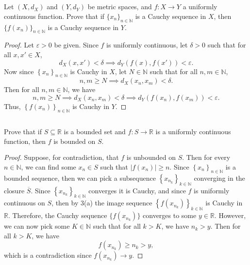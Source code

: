 \documentclass[12pt]{article}
\newenvironment{problem}
    {\begin{lrbox}{\mybox}\begin{minipage}{0.98\textwidth}}
    {\end{minipage}\end{lrbox}\framebox[\textwidth]{\usebox{\mybox}}}
\newcommand{\N}{\mathbb{N}}
\newcommand{\R}{\mathbb{R}}
\newcommand{\eps}{\varepsilon}
\newcommand{\seq}[2][n]{\left\{#2\right\}_{#1\in\N}}
\begin{document}
\newpage
\section{}
\subsection{}
\begin{problem}
    Let $(X,d_X)$ and $(Y,d_Y)$ be  metric spaces, and $f:X \to Y$ a uniformly continuous function. Prove that if $\{x_n\}_{n\in\N}$ is a Cauchy sequence in $X$, then $\{f(x_n)\}_{n\in\N}$ is a Cauchy sequence in $Y$. 
\end{problem}

\begin{proof}
    Let $\eps > 0$ be given. Since $f$ is uniformly continuous, let $\delta > 0$ such that for all $x, x' \in X$,
    \[
        d_X(x, x') < \delta \implies d_Y(f(x), f(x')) < \eps.
    \]
    Now since $\seq{x_n}$ is Cauchy in $X$, let $N \in \N$ such that for all $n, m \in \N$,
    \[
        n, m \geq N \implies d_X(x_n, x_m) < \delta.
    \]
    Then for all $n, m \in \N$, we have
    \[
        n, m \geq N \implies d_X(x_n, x_m) < \delta \implies d_Y(f(x_n), f(x_m)) < \eps.
    \]
    Thus, $\seq{f(x_n)}$ is Cauchy in $Y$.
    
\end{proof}

\subsection{}
\begin{problem}
    Prove that if $S\subseteq \R$ is a bounded set and $f:S\to \R$ is a uniformly continuous function, then $f$ is bounded on $S$.
\end{problem}

\begin{proof}
    Suppose, for contradiction, that $f$ is unbounded on $S$. Then for every $n \in \N$, we can find some $x_n \in S$ such that $|f(x_n)| \geq n$. Since $\seq{x_n}$ is a bounded sequence, then we can pick a subsequence $\seq[k]{x_{n_k}}$ converging in the closure $\overline{S}$. Since $\seq[k]{x_{n_k}}$ converges it is Cauchy, and since $f$ is uniformly continuous on $S$, then by 3(a) the image sequence $\seq[k]{f(x_{n_k})}$ is Cauchy in $\R$. Therefore, the Cauchy sequence $\{f(x_{n_k})\}$ converges to some $y \in \R$. However, we can now pick some $K \in \N$ such that for all $k > K$, we have $n_k > y$. Then for all $k > K$, we have
    \[
        f(x_{n_k}) \geq n_k > y,
    \]
    which is a contradiction since $f(x_{n_k}) \to y$.
    
\end{proof}
\end{document}
